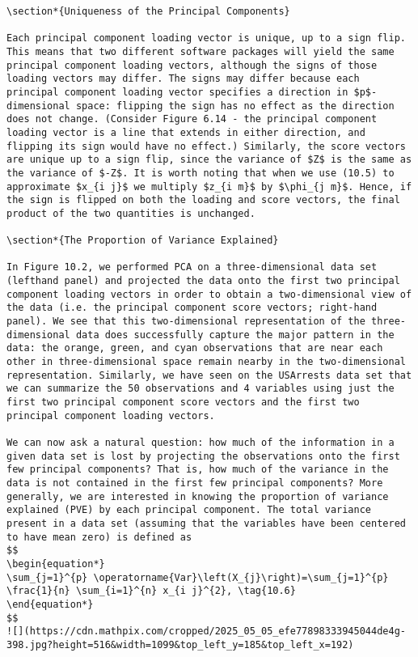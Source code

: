 \documentclass[10pt]{article}
\begin{document}
\begin{verbatim}
\section*{Uniqueness of the Principal Components}

Each principal component loading vector is unique, up to a sign flip. This means that two different software packages will yield the same principal component loading vectors, although the signs of those loading vectors may differ. The signs may differ because each principal component loading vector specifies a direction in $p$-dimensional space: flipping the sign has no effect as the direction does not change. (Consider Figure 6.14 - the principal component loading vector is a line that extends in either direction, and flipping its sign would have no effect.) Similarly, the score vectors are unique up to a sign flip, since the variance of $Z$ is the same as the variance of $-Z$. It is worth noting that when we use (10.5) to approximate $x_{i j}$ we multiply $z_{i m}$ by $\phi_{j m}$. Hence, if the sign is flipped on both the loading and score vectors, the final product of the two quantities is unchanged.

\section*{The Proportion of Variance Explained}

In Figure 10.2, we performed PCA on a three-dimensional data set (lefthand panel) and projected the data onto the first two principal component loading vectors in order to obtain a two-dimensional view of the data (i.e. the principal component score vectors; right-hand panel). We see that this two-dimensional representation of the three-dimensional data does successfully capture the major pattern in the data: the orange, green, and cyan observations that are near each other in three-dimensional space remain nearby in the two-dimensional representation. Similarly, we have seen on the USArrests data set that we can summarize the 50 observations and 4 variables using just the first two principal component score vectors and the first two principal component loading vectors.

We can now ask a natural question: how much of the information in a given data set is lost by projecting the observations onto the first few principal components? That is, how much of the variance in the data is not contained in the first few principal components? More generally, we are interested in knowing the proportion of variance explained (PVE) by each principal component. The total variance present in a data set (assuming that the variables have been centered to have mean zero) is defined as
$$
\begin{equation*}
\sum_{j=1}^{p} \operatorname{Var}\left(X_{j}\right)=\sum_{j=1}^{p} \frac{1}{n} \sum_{i=1}^{n} x_{i j}^{2}, \tag{10.6}
\end{equation*}
$$
![](https://cdn.mathpix.com/cropped/2025_05_05_efe77898333945044de4g-398.jpg?height=516&width=1099&top_left_y=185&top_left_x=192)


\end{verbatim}
\end{document}
